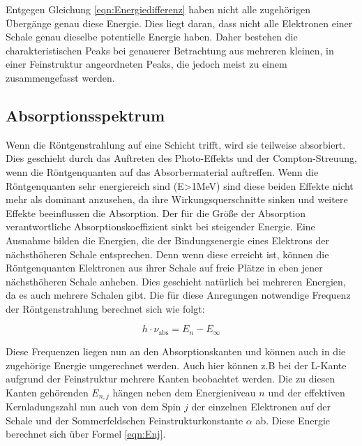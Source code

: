 \documentclass[titlepage = firstcover]{scrartcl}
\begin{document}
                \noindent
                Entgegen Gleichung \ref{eqn:Energiedifferenz} haben nicht alle zugehörigen Übergänge genau diese Energie. Dies liegt daran, dass nicht alle Elektronen einer Schale genau dieselbe
                potentielle Energie haben. Daher bestehen die charakteristischen Peaks bei genauerer Betrachtung aus mehreren kleinen, in einer Feinstruktur angeordneten Peaks, die jedoch meist zu 
                einem zusammengefasst werden.

        \subsection{Absorptionsspektrum}
            Wenn die Röntgenstrahlung auf eine Schicht trifft, wird sie teilweise absorbiert. Dies geschieht durch das Auftreten des Photo-Effekts und der Compton-Streuung, wenn die Röntgenquanten
            auf das Absorbermaterial auftreffen. Wenn die Röntgenquanten sehr energiereich sind (E>1MeV) sind diese beiden Effekte nicht mehr als dominant anzusehen, da ihre Wirkungsquerschnitte 
            sinken und weitere Effekte beeinflussen die Absorption. Der für die Größe der Absorption verantwortliche Absorptionskoeffizient sinkt bei steigender Energie. Eine Ausnahme bilden die 
            Energien, die der Bindungsenergie eines Elektrons der nächsthöheren Schale entsprechen. Denn wenn diese erreicht ist, können die Röntgenquanten Elektronen aus ihrer Schale auf freie
            Plätze in eben jener nächsthöheren Schale anheben. Dies geschieht natürlich bei mehreren Energien, da es auch mehrere Schalen gibt. Die für diese Anregungen notwendige Frequenz
            der Röntgenstrahlung berechnet sich wie folgt:

            \begin{equation}
              h \cdot \nu_{\text{abs}} = E_n - E_{\infty}
            \end{equation}
            
            \noindent
            Diese Frequenzen liegen nun an den Absorptionskanten und können auch in die zugehörige Energie umgerechnet werden. Auch hier können z.B bei der L-Kante aufgrund der Feinstruktur mehrere
            Kanten beobachtet werden. Die zu diesen Kanten gehörenden $E_{n,j}$ hängen neben dem Energieniveau $n$ und der effektiven Kernladungszahl nun auch von dem Spin $j$ der einzelnen Elektronen
            auf der Schale und der Sommerfeldschen Feinstrukturkonstante $\alpha$ ab. Diese Energie berechnet sich über Formel \ref{eqn:Enj}.
\end{document}
